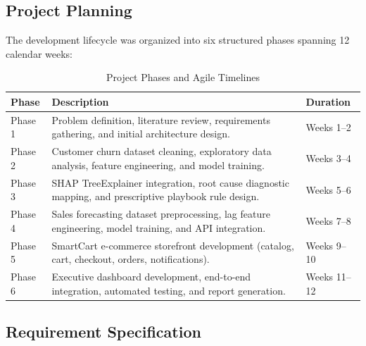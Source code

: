 \documentclass[12pt,a4paper]{article}
\begin{document}
\subsection{Project Planning}\label{sub:2.5}

The development lifecycle was organized into six structured phases spanning 12 calendar weeks:

\begin{table}[H]
\centering
\small
\caption{Project Phases and Agile Timelines}
\begin{tabularx}{\linewidth}{|C{2.0cm}|Y|C{2.5cm}|}
\hline
\textbf{Phase} & \textbf{Description} & \textbf{Duration} \\ \hline
Phase 1 & Problem definition, literature review, requirements gathering, and initial architecture design. & Weeks 1--2 \\ \hline
Phase 2 & Customer churn dataset cleaning, exploratory data analysis, feature engineering, and model training. & Weeks 3--4 \\ \hline
Phase 3 & SHAP TreeExplainer integration, root cause diagnostic mapping, and prescriptive playbook rule design. & Weeks 5--6 \\ \hline
Phase 4 & Sales forecasting dataset preprocessing, lag feature engineering, model training, and API integration. & Weeks 7--8 \\ \hline
Phase 5 & SmartCart e-commerce storefront development (catalog, cart, checkout, orders, notifications). & Weeks 9--10 \\ \hline
Phase 6 & Executive dashboard development, end-to-end integration, automated testing, and report generation. & Weeks 11--12 \\ \hline
\end{tabularx}
\label{tab:phases_timelines}
\end{table}

\subsection{Requirement Specification}\label{sub:2.6}
\end{document}
